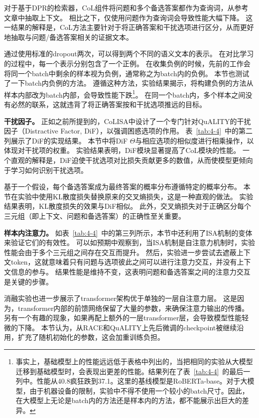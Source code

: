 

对于基于DPR的检索器，CoL组件将问题和多个备选答案都作为查询词，从参考文章中抽取上下文。
相比之下，仅使用问题作为查询词会导致性能大幅下降。
这一结果的解释是，CoL方法主要针对于将正确答案和干扰选项进行区分，从而更好地抽取与问题/备选答案相关的证据文本。

通过使用标准的dropout两次，可以得到两个不同的语义文本的表示。
在对比学习的过程中，每一个表示分别包含了一个正例。
在收集负例的时候，先前的工作会将同一个batch中剩余的样本视为负例，通常称之为batch内的负例\cite{gao2021simcse}。
本节也测试了一下batch内负例的方法。
遵循这种方法，实验结果揭示，将构建负例的方法从样本内部改为batch内部，会导致性能下跌\footnote{事实上，基础模型上的性能远远低于表格中列出的，当把相同的实验从大模型迁移到基础模型时，会表现出更差的性能。结果列在了表~\ref{tab:4-4}~的最后一列中。性能从40.8疯狂跌到37.1。这里的基线模型是RoBERTa-base。对于大模型，由于机器设备的限制，实验中不得不使用一个较小的batch尺寸。因此，在大模型上无论是batch内的方法还是样本内的方法，都不能展示出巨大的差异。}。
在同一个batch内，多个样本之间没有必然的联系，这就违背了将正确答案按和干扰选项推远的目标。

\textbf{干扰因子。}
正如之前所提到的，CoLISA中设计了一个专门针对QuALITY的干扰因子（Distractive Factor, DiF），以强调困惑选项的作用。
表~\ref{tab:4-4}~中的第二列展示了DiF的实现结果。
本节中将DiF $\Theta$与相应选项的相似度进行相乘操作，以体现对干扰项的权重。
实验结果表明，DiF模块显著提高了CoL模块的性能。
一个直观的解释是，DiF迫使干扰选项对比损失贡献更多的数值，从而使模型更倾向于学习如何识别干扰选项。

基于一个假设，每个备选答案成为最终答案的概率分布遵循特定的概率分布。
本节在实验中使用KL散度损失\cite{hershey2007approximating}替换原来的交叉熵损失，这是一种直观的做法。
实验结果表明，KL散度损失的效果与DiF相似。
此外，交叉熵损失对于正确区分每个三元组（即上下文、问题和备选答案）的正确性至关重要。

\textbf{样本内注意力。}
如表~\ref{tab:4-4}~中的第三列所示，本节中还利用了ISA机制的变体来验证它们的有效性。
可以如预期中观察到，当ISA机制是自注意力机制时，实验性能会由于多个三元组之间存在交互而提升。
然后，实验进一步尝试去遮蔽上下文token，这就意味着只有问题与选项彼此之间可以进行注意力交互，并没有上下文信息的参与。
结果性能是维持不变，这表明问题和备选答案之间的注意力交互是关键的步骤。

消融实验也进一步展示了transformer架构优于单独的一层自注意力层。
这是因为，transformer内部的前馈网络保留了大量的参数，来确保注意力输出的传播。
另有一个有趣的现象，如果再配上额外的一层transformer层，会导致模型性能轻微的下降。
本节认为，从RACE和QuALITY上先后微调的checkpoint被继续沿用，扩充了随机初始化的参数，这会加重训练负担。

